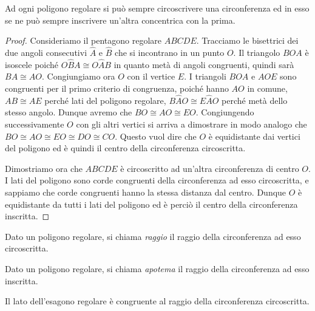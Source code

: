 \begin{teorema}\label{teo:poly_reg_circ_inscr_circos}
Ad ogni poligono regolare si può sempre circoscrivere una circonferenza ed in esso se ne può sempre inscrivere un'altra concentrica con la prima.
\end{teorema}

\begin{figure}[!htb]
	\centering
\end{figure}

\begin{proof}
Consideriamo il pentagono regolare $ABCDE$. Tracciamo le bisettrici dei due angoli consecutivi $\widehat{A}$ e $\widehat{B}$ che si incontrano in un punto $O$. Il triangolo $BOA$ è isoscele poiché $O\widehat{B}A\cong O\widehat{A}B$ in quanto metà di angoli congruenti, quindi sarà $BA\cong AO$. Congiungiamo ora $O$ con il vertice $E$. I triangoli $BOA$ e $AOE$ sono congruenti per il primo criterio di congruenza, poiché hanno $AO$ in comune, $AB\cong AE$ perché lati del poligono regolare, $B\widehat{A}O\cong E\widehat{A}O$ perché metà dello stesso angolo. Dunque avremo che $BO\cong AO\cong EO$. Congiungendo successivamente $O$ con gli altri vertici si arriva a dimostrare in modo analogo che $BO\cong AO\cong EO\cong DO\cong CO$. Questo vuol dire che $O$ è equidistante dai vertici del poligono ed è quindi il centro della circonferenza circoscritta.

Dimostriamo ora che $ABCDE$ è circoscritto ad un'altra circonferenza di centro $O$. I lati del poligono sono corde congruenti della circonferenza ad esso circoscritta, e sappiamo che corde congruenti hanno la stessa distanza dal centro. Dunque $O$ è equidistante da tutti i lati del poligono ed è perciò il centro della circonferenza inscritta. 
\end{proof}

\begin{definizione}
Dato un poligono regolare, si chiama \emph{raggio} il raggio della circonferenza ad esso circoscritta.
\end{definizione}

\begin{definizione}
Dato un poligono regolare, si chiama \emph{apotema} il raggio della circonferenza ad esso inscritta.
\end{definizione}

\begin{teorema}
Il lato dell'esagono regolare è congruente al raggio della circonferenza circoscritta.
\end{teorema}

